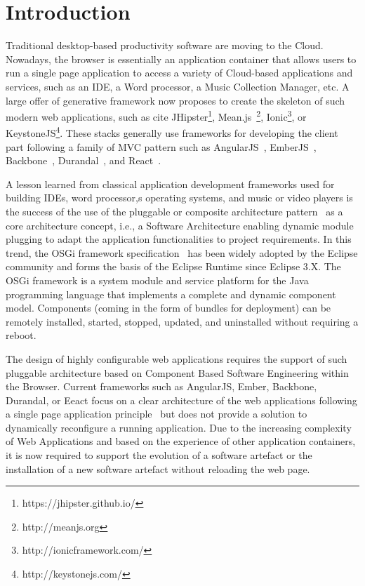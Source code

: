 \section{Introduction}

Traditional desktop-based productivity software are moving to the Cloud. 
Nowadays, the browser is essentially an application container that allows users to run a single page application to  access a variety of Cloud-based applications and services, such as an IDE, a Word processor, a Music Collection Manager, etc. 
A large offer of generative framework now proposes to create the skeleton of such modern web applications, such as cite JHipster\footnote{https://jhipster.github.io/}, Mean.js~\footnote{http://meanjs.org}, Ionic\footnote{http://ionicframework.com/}, or KeystoneJS\footnote{http://keystonejs.com/}.
These stacks generally use frameworks for developing the client part following a family of MVC pattern such as AngularJS~\cite{green2013angularjs}, EmberJS~\cite{cravens2014building}, Backbone~\cite{osmani2013developing}, Durandal~\cite{monteiro2014learning}, and React~\cite{fedosejev2015react}.  

A lesson learned from classical application development frameworks used for building IDEs, word processor,s operating systems, and music or video players is the success of the use of the pluggable or composite architecture pattern~\cite{115158,schmidt2013pattern} as a core architecture concept,  i.e., a Software Architecture enabling dynamic module plugging to adapt the application functionalities to project requirements. In this trend, the OSGi framework specification~\cite{hall2011osgi} has been widely adopted by the Eclipse community and forms the basis of the Eclipse Runtime since Eclipse 3.X. The OSGi framework is a system module  and service platform for the Java programming language that implements a complete and dynamic component model. Components (coming in the form of bundles for deployment) can be remotely installed, started, stopped, updated, and uninstalled without requiring a reboot. %

The design of highly configurable web applications requires the support of such pluggable architecture based on Component Based Software Engineering within the Browser. Current frameworks such as AngularJS, Ember, Backbone, Durandal, or Eeact focus on a clear architecture of the web applications following a single page application principle~\cite{monteiro2014learning} but does not provide a solution to dynamically reconfigure a running application. Due to the increasing complexity of Web Applications and based on the experience of other application containers, it is now required to support the evolution of a software artefact or the installation of a new software artefact without reloading the web page.  

